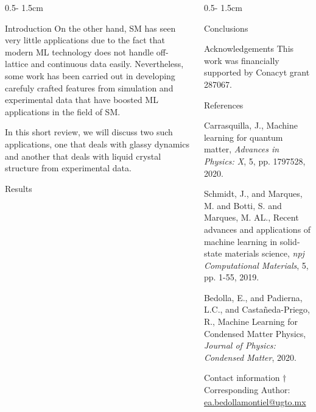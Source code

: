 \documentclass{uioposter}
\begin{document}
\begin{frame}
\begin{columns}[onlytextwidth]
\begin{column}{0.5\textwidth - 1.5cm}
\begin{block}{Introduction}
        On the other hand, SM has seen very little applications due
        to the fact that modern ML technology does not handle off-lattice and
        continuous data easily. Nevertheless, some work has been carried out
        in developing carefuly crafted features from simulation and experimental
        data that have boosted ML applications in the field of SM.

        In this short review, we will discuss two such applications, one that deals
        with glassy dynamics and another that deals with liquid crystal structure
        from experimental data.
    \end{block}

    \begin{block}{Results}
    \end{block}
\end{column}


\begin{column}{0.5\textwidth - 1.5cm}
    \begin{block}{Conclusions}
        \lipsum[4]
    \end{block}

    \begin{block}{Acknowledgements}
        This work was financially supported by Conacyt grant 287067.
    \end{block}

    \begin{block}{References}
        \begin{thebibliography}{99}
            Carrasquilla, J.,
            Machine learning for quantum matter,
            \emph{Advances in Physics: X},
            5, pp. 1797528, 2020.
            
            Schmidt, J., and Marques, M. and Botti, S. and Marques, M. AL.,
            Recent advances and applications of machine learning in solid-state materials science,
            \emph{npj Computational Materials},
            5, pp. 1-55, 2019.
            
            Bedolla, E., and Padierna, L.C., and Casta{\~n}eda-Priego, R.,
            Machine Learning for Condensed Matter Physics,
            \emph{Journal of Physics: Condensed Matter},
            2020.
            
            \end{thebibliography}
    \end{block}

    \begin{block}{Contact information}
        $\dagger$ Corresponding Author: \href{mailto:ea.bedollamontiel@ugto.mx}{ea.bedollamontiel@ugto.mx}
        \\
    \end{block}
\end{column}


\end{columns}


\end{frame}
\end{document}
